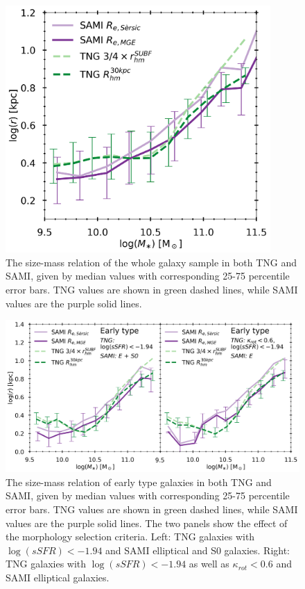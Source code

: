 \begin{figure}
    \centering
    \includegraphics[width=0.9\textwidth]{images/SM_R.png}
    \caption{The size-mass relation of the whole galaxy sample in both TNG and SAMI, given by median values with corresponding 25-75 percentile error bars. TNG values are shown in green dashed lines, while SAMI values are the purple solid lines.}
    \label{SM_R}
\end{figure}


\begin{figure}
    \centering
    \includegraphics[width=\textwidth]{images/SM_R_earlies.png}
    \caption{The size-mass relation of early type galaxies in both TNG and SAMI, given by median values with corresponding 25-75 percentile error bars. TNG values are shown in green dashed lines, while SAMI values are the purple solid lines. The two panels show the effect of the morphology selection criteria. Left: TNG galaxies with $\log(sSFR) < -1.94$ and SAMI elliptical and S0 galaxies. Right: TNG galaxies with $\log(sSFR) < -1.94$ as well as $\kappa_{rot} < 0.6$ and SAMI elliptical galaxies.}
    \label{SM_R_earlies}
\end{figure}

